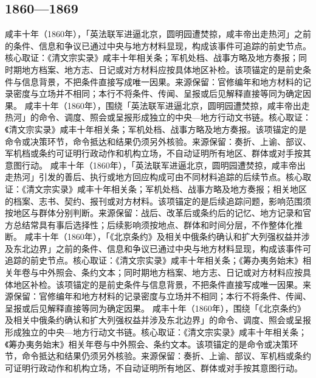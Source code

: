 \subsection{1860—1869}
咸丰十年（1860年），「英法联军进逼北京，圆明园遭焚掠，咸丰帝出走热河」之前的条件、信息和争议已通过中央与地方材料显现，构成该事件可追踪的前史节点。核心取证：《清文宗实录》咸丰十年相关条；军机处档、战事方略及地方奏报；同时期地方档案、地方志、日记或对方材料应按具体地区补检。该项锚定的是前史条件与信息背景，不把条件直接写成唯一因果。来源保留：官修编年和地方材料的记录密度与立场并不相同；本行不将条件、传闻、呈报或后见解释直接等同为确定因果。
咸丰十年（1860年），围绕「英法联军进逼北京，圆明园遭焚掠，咸丰帝出走热河」的命令、调度、照会或呈报形成独立的中央—地方行动文书链。核心取证：《清文宗实录》咸丰十年相关条；军机处档、战事方略及地方奏报。该项锚定的是命令或决策环节，命令抵达和结果仍须另外核验。来源保留：奏折、上谕、部议、军机档或条约可证明行政动作和机构立场，不自动证明所有地区、群体或对手按其意图行动。
咸丰十年（1860年），「英法联军进逼北京，圆明园遭焚掠，咸丰帝出走热河」引发的善后、执行或地方回应构成可由不同材料追踪的后续节点。核心取证：《清文宗实录》咸丰十年相关条；军机处档、战事方略及地方奏报；相关地区的档案、志书、契约、报刊或对方材料。该项锚定的是后续追踪问题，影响范围须按地区与群体分别判断。来源保留：战后、改革后或条约后的记忆、地方记录和官方总结常具有事后选择性；后续影响须按地点、群体和时间分层，不作整体化推断。
咸丰十年（1860年），「《北京条约》及相关中俄条约确认和扩大列强权益并涉及东北边界」之前的条件、信息和争议已通过中央与地方材料显现，构成该事件可追踪的前史节点。核心取证：《清文宗实录》咸丰十年相关条；《筹办夷务始末》相关年卷与中外照会、条约文本；同时期地方档案、地方志、日记或对方材料应按具体地区补检。该项锚定的是前史条件与信息背景，不把条件直接写成唯一因果。来源保留：官修编年和地方材料的记录密度与立场并不相同；本行不将条件、传闻、呈报或后见解释直接等同为确定因果。
咸丰十年（1860年），围绕「《北京条约》及相关中俄条约确认和扩大列强权益并涉及东北边界」的命令、调度、照会或呈报形成独立的中央—地方行动文书链。核心取证：《清文宗实录》咸丰十年相关条；《筹办夷务始末》相关年卷与中外照会、条约文本。该项锚定的是命令或决策环节，命令抵达和结果仍须另外核验。来源保留：奏折、上谕、部议、军机档或条约可证明行政动作和机构立场，不自动证明所有地区、群体或对手按其意图行动。
